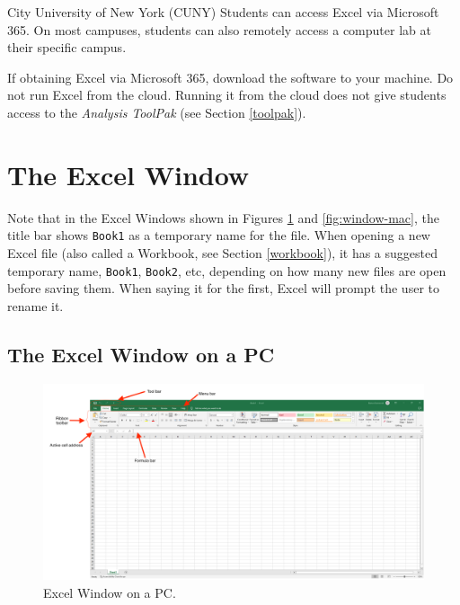 \documentclass[
]{book}
\begin{document}
City University of New York (CUNY) Students can access Excel via Microsoft 365. On most campuses, students can also remotely access a computer lab at their specific campus.

If obtaining Excel via Microsoft 365, download the software to your machine. Do not run Excel from the cloud. Running it from the cloud does not give students access to the \emph{Analysis ToolPak} (see Section \ref{toolpak}).

\hypertarget{the-excel-window}{%
\section{The Excel Window}\label{the-excel-window}}

Note that in the Excel Windows shown in Figures \ref{fig:window-pc} and \ref{fig:window-mac}, the title bar shows \texttt{Book1} as a temporary name for the file. When opening a new Excel file (also called a Workbook, see Section \ref{workbook}), it has a suggested temporary name, \texttt{Book1}, \texttt{Book2}, etc, depending on how many new files are open before saving them. When saying it for the first, Excel will prompt the user to rename it.

\hypertarget{the-excel-window-on-a-pc}{%
\subsection{The Excel Window on a PC}\label{the-excel-window-on-a-pc}}

\begin{figure}

{\centering \includegraphics[width=1.5\linewidth]{window-pc} 

}

\caption{Excel Window on a PC.}\label{fig:window-pc}
\end{figure}
\end{document}
